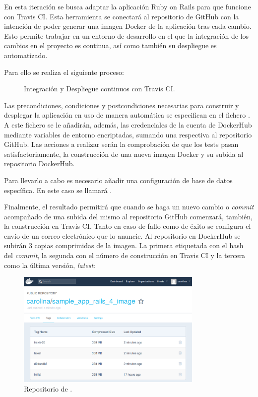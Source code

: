 En esta iteración se busca adaptar la aplicación Ruby on Rails para que funcione con Travis CI. Esta herramienta se conectará al repositorio de GitHub  con la intención de poder generar una imagen Docker de la aplicación tras cada cambio. Esto permite trabajar en un entorno de desarrollo en el que la integración de los cambios en el proyecto es continua, así como también su despliegue es automatizado.

Para ello se realiza el siguiente proceso:
\begin{figure}[H]
\caption{Integración y Despliegue continuos con Travis CI.\label{fig:figure_placement_example}}
\end{figure}

Las precondiciones, condiciones y postcondiciones necesarias para construir y desplegar la aplicación en uso de manera automática se especifican en el fichero . A este fichero se le añadirán, además, las credenciales de la cuenta de DockerHub mediante variables de entorno encriptadas, sumando una respectiva al repositorio GitHub. Las acciones a realizar serán la comprobación de que los tests pasan satisfactoriamente, la construcción de una nueva imagen Docker y su subida al repositorio DockerHub.

Para llevarlo a cabo es necesario añadir una configuración de base de datos específica. En este caso se llamará .

Finalmente, el resultado permitirá que cuando se haga un nuevo cambio o \textit{commit} acompañado de una subida del mismo al repositorio GitHub comenzará, también, la construcción en Travis CI. Tanto en caso de fallo como de éxito se configura el envío de un correo electrónico que lo anuncie. Al repositorio en DockerHub se subirán 3 copias comprimidas de la imagen. La primera etiquetada con el hash del \textit{commit}, la segunda con el número de construcción en Travis CI y la tercera como la última versión, \textit{latest}:

\begin{figure}[H]
\centering
\includegraphics[width=0.8\textwidth]{images/figures/dockerhubimages.png}
\caption{Repositorio de .\label{fig:dockerhub_images}}
\end{figure}

